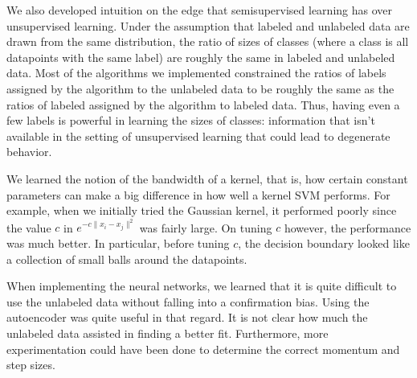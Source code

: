 \documentclass[11pt]{article}
\begin{document}
We also developed intuition on the edge that semisupervised learning has over unsupervised learning.
Under the assumption that labeled and unlabeled data are drawn from the same distribution, the ratio of
sizes of classes (where a class is all datapoints with the same label) are roughly the same in labeled
and unlabeled data. Most of the algorithms we implemented constrained the ratios of labels
assigned by the algorithm to the unlabeled data to be roughly the same as the ratios of labeled assigned
by the algorithm to labeled data. Thus, having even a few labels is powerful in learning the sizes of
classes: information that isn't available in the setting of unsupervised learning that could lead to
degenerate behavior.

We learned the notion of the bandwidth of a kernel, that is,
how certain constant parameters can make a big difference in how well
a kernel SVM performs. For example, when we initially tried the
Gaussian kernel, it performed poorly since the value
$c$ in $e^{-c\|x_i-x_j\|^2}$ was fairly large.
On tuning $c$ however, the performance was much better. In particular,
before tuning $c$, the decision boundary looked like a collection of
small balls around the datapoints.

When implementing the neural networks, we learned that it is quite difficult to use the unlabeled data without falling into a confirmation bias. Using the autoencoder was quite useful in that regard. It is not clear how much the unlabeled data assisted in finding a better fit. Furthermore, more experimentation could have been done to determine the correct momentum and step sizes.



\end{document}
